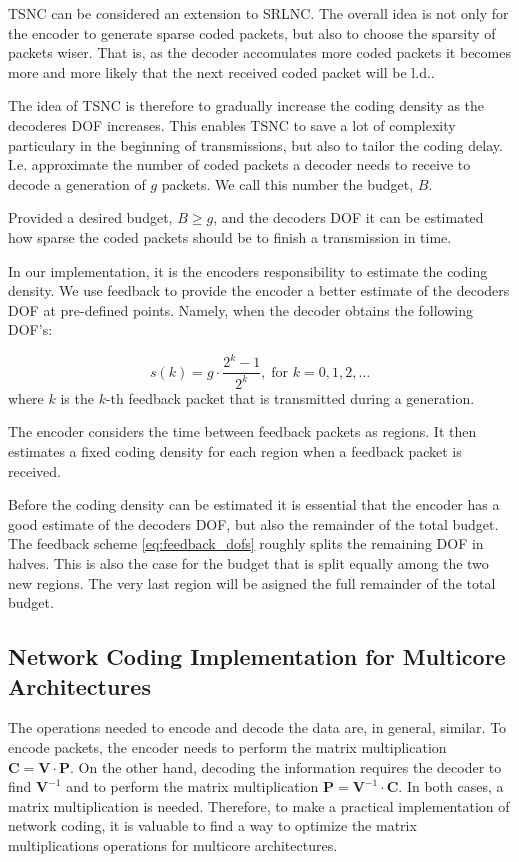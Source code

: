 \ac{TSNC} can be considered an extension to \ac{SRLNC}. The overall idea is
not only for the encoder to generate sparse coded packets, but also to
choose the sparsity of packets wiser. That is, as the decoder accomulates more
coded packets it becomes more and more likely that the next received
coded packet will be \ac{l.d.}.

The idea of \ac{TSNC} is therefore to gradually increase the coding density
as the decoderes \ac{DOF} increases. This enables TSNC to save a lot of
complexity particulary in the beginning of transmissions, but also to
tailor the coding delay. I.e. approximate the number of coded packets a
decoder needs to receive to decode a generation of $g$ packets. We call
this number the budget, $B$.

Provided a desired budget, $B \geq g$, and the decoders \ac{DOF} it can be
estimated how sparse the coded packets should be to finish a transmission in
time.

In our implementation, it is the encoders responsibility to estimate the coding
density. We use feedback to provide the encoder a better estimate of the
decoders \ac{DOF} at pre-defined points. Namely, when the decoder obtains the
following \ac{DOF}'s:

\begin{equation}\label{eq:feedback_dofs}
    s(k) = g\cdot \frac{2^k -1}{2^k},  \; \text{for } k=0,1,2,\dots
\end{equation}
where $k$ is the $k$-th feedback packet that is transmitted during a generation.

The encoder considers the time between feedback packets as regions. It then
estimates a fixed coding density for each region when a feedback packet is
received.

Before the coding density can be estimated it is essential that the encoder
has a good estimate of the decoders \ac{DOF}, but also the remainder of the
total budget. The feedback scheme \ref{eq:feedback_dofs} roughly splits the
remaining \ac{DOF} in halves. This is also the case for the budget that is
split equally among the two new regions. The very last region will be asigned
the full remainder of the total budget.

\subsection{Network Coding Implementation for Multicore Architectures}
\label{sub:implementation-multicore}

The operations needed to encode and decode the data are, in general, similar. To
encode packets, the encoder needs to perform the matrix multiplication
$\textbf{C} = \textbf{V} \cdot \textbf{P}$. On the other hand, decoding the
information requires the decoder to find $\textbf{V}^{-1}$ and to perform the
matrix multiplication $\textbf{P} = \textbf{V}^{-1} \cdot \textbf{C}$. In both
cases, a matrix multiplication is needed. Therefore, to make a practical
implementation of network coding, it is valuable to find a way to optimize the
matrix multiplications operations for multicore architectures.

